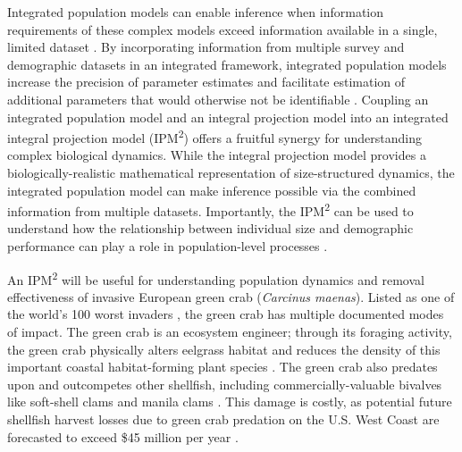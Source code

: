 \documentclass{article}
\begin{document}
Integrated population models can enable inference when information requirements of these complex models exceed information available in a single, limited dataset \parencite{besbeas2002integrating}. By incorporating information from multiple survey and demographic datasets in an integrated framework, integrated population models increase the precision of parameter estimates and facilitate estimation of additional parameters that would otherwise not be identifiable \parencite{riecke2019integrated, abadi2010assessment}. Coupling an integrated population model and an integral projection model into an integrated integral projection model (IPM\textsuperscript{2}) offers a fruitful synergy for understanding complex biological dynamics. While the integral projection model provides a biologically-realistic mathematical representation of size-structured dynamics, the integrated population model can make inference possible via the combined information from multiple datasets. Importantly, the IPM\textsuperscript{2} can be used to understand how the relationship between individual size and demographic performance can play a role in population-level processes \parencite{plard2019ipm}.

An IPM\textsuperscript{2} will be useful for understanding population dynamics and removal effectiveness of invasive European green crab (\textit{Carcinus maenas}). Listed as one of the world’s 100 worst invaders \parencite{lowe2000100}, the green crab has multiple documented modes of impact. The green crab is an ecosystem engineer; through its foraging activity, the green crab physically alters eelgrass habitat and reduces the density of this important coastal habitat-forming plant species \parencite{garbary2014drastic, howard2019habitat}. The green crab also predates upon and outcompetes other shellfish, including commercially-valuable bivalves like soft-shell clams and manila clams \parencite{grosholz2000impacts, fisher2024invasive}. This damage is costly, as potential future shellfish harvest losses due to green crab predation on the U.S. West Coast are forecasted to exceed \$45 million per year \parencite{grosholz2011modeling}. 
\end{document}
